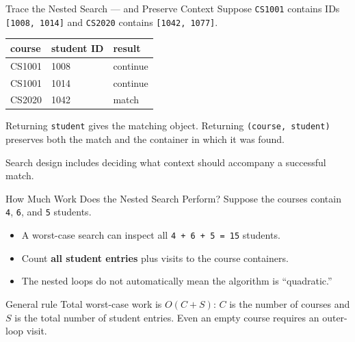 \documentclass[aspectratio=169,10pt]{beamer}
\begin{document}
\begin{frame}{Trace the Nested Search --- and Preserve Context}
  Suppose \texttt{CS1001} contains IDs \texttt{[1008, 1014]} and \texttt{CS2020} contains \texttt{[1042, 1077]}.

  \begin{center}
    \renewcommand{\arraystretch}{1.20}
    \begin{tabular}{l|l|l}
      \textbf{course} & \textbf{student ID} & \textbf{result} \\\hline
      CS1001 & 1008 & continue \\
      CS1001 & 1014 & continue \\
      CS2020 & 1042 & match
    \end{tabular}
  \end{center}

  Returning \texttt{student} gives the matching object. Returning \texttt{(course, student)} preserves both the match and the container in which it was found.

  \begin{keyidea}
    Search design includes deciding what context should accompany a successful match.
  \end{keyidea}
\end{frame}

\begin{frame}{How Much Work Does the Nested Search Perform?}
  Suppose the courses contain \texttt{4}, \texttt{6}, and \texttt{5} students.

  \begin{itemize}
    \item A worst-case search can inspect all \texttt{4 + 6 + 5 = 15} students.
    \item Count \textbf{all student entries} plus visits to the course containers.
    \item The nested loops do not automatically mean the algorithm is ``quadratic.''
  \end{itemize}

  \begin{block}{General rule}
    Total worst-case work is $O(C+S)$: $C$ is the number of courses and $S$ is the total number of student entries. Even an empty course requires an outer-loop visit.
  \end{block}
\end{frame}
\end{document}
